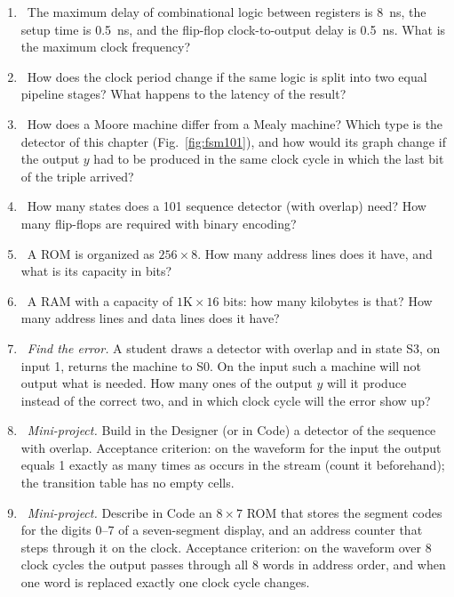 \begin{taskbox}
\begin{enumerate}
  \item {}~The maximum delay of combinational logic between registers is 8~ns, the setup time is 0.5~ns, and the flip-flop clock-to-output delay is 0.5~ns. What is the maximum clock frequency?
  \item {}~How does the clock period change if the same logic is split into two equal pipeline stages? What happens to the latency of the result?
  \item {}~How does a Moore machine differ from a Mealy machine? Which type is the  detector of this chapter (Fig.~\ref{fig:fsm101}), and how would its graph change if the output $y$ had to be produced in the same clock cycle in which the last bit of the triple arrived?
  \item {}~How many states does a 101 sequence detector (with overlap) need? How many flip-flops are required with binary encoding?
  \item {}~A ROM is organized as $256\times 8$. How many address lines does it have, and what is its capacity in bits?
  \item {}~A RAM with a capacity of $1\text{K}\times 16$ bits: how many kilobytes is that? How many address lines and data lines does it have?
  \item {}~\emph{Find the error.} A student draws a  detector with overlap and in state S3, on input 1, returns the machine to S0. On the input  such a machine will not output what is needed. How many ones of the output $y$ will it produce instead of the correct two, and in which clock cycle will the error show up?
  \item {}~\emph{Mini-project.} Build in the Designer (or in Code) a detector of the sequence  with overlap. Acceptance criterion: on the waveform for the input  the output equals 1 exactly as many times as  occurs in the stream (count it beforehand); the transition table has no empty cells.
  \item {}~\emph{Mini-project.} Describe in Code an $8\times 7$ ROM that stores the segment codes for the digits 0--7 of a seven-segment display, and an address counter that steps through it on the clock. Acceptance criterion: on the waveform over 8 clock cycles the output passes through all 8 words in address order, and when one word is replaced exactly one clock cycle changes.
\end{enumerate}
\end{taskbox}

